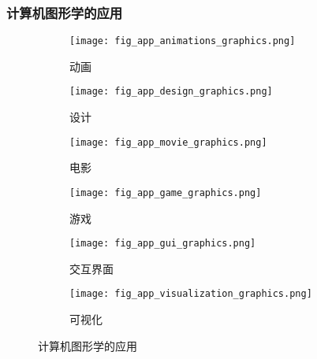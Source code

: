 \begin{frame}
    \frametitle{计算机图形学的应用}
    \begin{figure}[ht!]
        \centering
        \begin{subfigure}{0.3\textwidth}
            \centering
            \texttt{[image: fig\_app\_animations\_graphics.png]}
            \caption{动画}
        \end{subfigure}
        \begin{subfigure}{0.3\textwidth}
            \texttt{[image: fig\_app\_design\_graphics.png]}
            \caption{设计}
        \end{subfigure}
        \begin{subfigure}{0.3\textwidth}
            \centering
            \texttt{[image: fig\_app\_movie\_graphics.png]}
            \caption{电影}
        \end{subfigure}
        \begin{subfigure}{0.3\textwidth}
            \texttt{[image: fig\_app\_game\_graphics.png]}
            \caption{游戏}
        \end{subfigure}
        \begin{subfigure}{0.3\textwidth}
            \centering
            \texttt{[image: fig\_app\_gui\_graphics.png]}
            \caption{交互界面}
        \end{subfigure}
        \begin{subfigure}{0.3\textwidth}
            \texttt{[image: fig\_app\_visualization\_graphics.png]}
            \caption{可视化}
        \end{subfigure}
        \caption{计算机图形学的应用}
        \label{fig:app_computer_graphics}
    \end{figure}
\end{frame}
